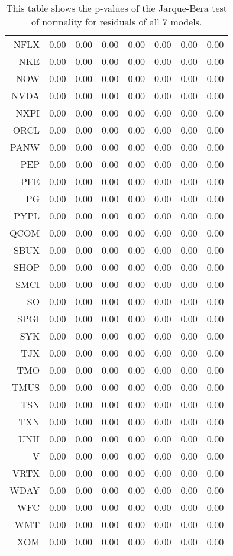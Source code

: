 \begin{table}[ht]
\begin{tabular}{rrrrrrrr}
  NFLX & 0.00 & 0.00 & 0.00 & 0.00 & 0.00 & 0.00 & 0.00 \\ 
  NKE & 0.00 & 0.00 & 0.00 & 0.00 & 0.00 & 0.00 & 0.00 \\ 
  NOW & 0.00 & 0.00 & 0.00 & 0.00 & 0.00 & 0.00 & 0.00 \\ 
  NVDA & 0.00 & 0.00 & 0.00 & 0.00 & 0.00 & 0.00 & 0.00 \\ 
  NXPI & 0.00 & 0.00 & 0.00 & 0.00 & 0.00 & 0.00 & 0.00 \\ 
  ORCL & 0.00 & 0.00 & 0.00 & 0.00 & 0.00 & 0.00 & 0.00 \\ 
  PANW & 0.00 & 0.00 & 0.00 & 0.00 & 0.00 & 0.00 & 0.00 \\ 
  PEP & 0.00 & 0.00 & 0.00 & 0.00 & 0.00 & 0.00 & 0.00 \\ 
  PFE & 0.00 & 0.00 & 0.00 & 0.00 & 0.00 & 0.00 & 0.00 \\ 
  PG & 0.00 & 0.00 & 0.00 & 0.00 & 0.00 & 0.00 & 0.00 \\ 
  PYPL & 0.00 & 0.00 & 0.00 & 0.00 & 0.00 & 0.00 & 0.00 \\ 
  QCOM & 0.00 & 0.00 & 0.00 & 0.00 & 0.00 & 0.00 & 0.00 \\ 
  SBUX & 0.00 & 0.00 & 0.00 & 0.00 & 0.00 & 0.00 & 0.00 \\ 
  SHOP & 0.00 & 0.00 & 0.00 & 0.00 & 0.00 & 0.00 & 0.00 \\ 
  SMCI & 0.00 & 0.00 & 0.00 & 0.00 & 0.00 & 0.00 & 0.00 \\ 
  SO & 0.00 & 0.00 & 0.00 & 0.00 & 0.00 & 0.00 & 0.00 \\ 
  SPGI & 0.00 & 0.00 & 0.00 & 0.00 & 0.00 & 0.00 & 0.00 \\ 
  SYK & 0.00 & 0.00 & 0.00 & 0.00 & 0.00 & 0.00 & 0.00 \\ 
  TJX & 0.00 & 0.00 & 0.00 & 0.00 & 0.00 & 0.00 & 0.00 \\ 
  TMO & 0.00 & 0.00 & 0.00 & 0.00 & 0.00 & 0.00 & 0.00 \\ 
  TMUS & 0.00 & 0.00 & 0.00 & 0.00 & 0.00 & 0.00 & 0.00 \\ 
  TSN & 0.00 & 0.00 & 0.00 & 0.00 & 0.00 & 0.00 & 0.00 \\ 
  TXN & 0.00 & 0.00 & 0.00 & 0.00 & 0.00 & 0.00 & 0.00 \\ 
  UNH & 0.00 & 0.00 & 0.00 & 0.00 & 0.00 & 0.00 & 0.00 \\ 
  V & 0.00 & 0.00 & 0.00 & 0.00 & 0.00 & 0.00 & 0.00 \\ 
  VRTX & 0.00 & 0.00 & 0.00 & 0.00 & 0.00 & 0.00 & 0.00 \\ 
  WDAY & 0.00 & 0.00 & 0.00 & 0.00 & 0.00 & 0.00 & 0.00 \\ 
  WFC & 0.00 & 0.00 & 0.00 & 0.00 & 0.00 & 0.00 & 0.00 \\ 
  WMT & 0.00 & 0.00 & 0.00 & 0.00 & 0.00 & 0.00 & 0.00 \\ 
  XOM & 0.00 & 0.00 & 0.00 & 0.00 & 0.00 & 0.00 & 0.00 \\ 
   \hline
\end{tabular}
\caption[p-values of Jarque-Bera test on model residuals]{This table shows the p-values of the Jarque-Bera test of normality for residuals of all 7 models.} 
\label{Table:JBresid_p_vals}
\end{table}
